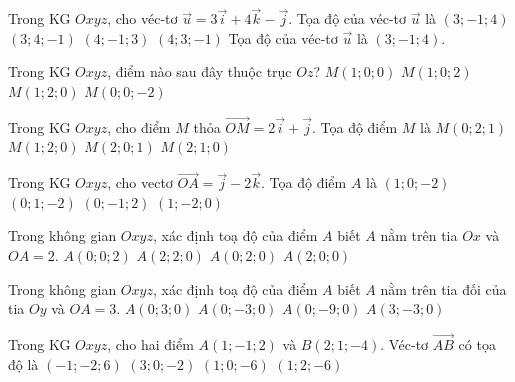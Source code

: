 \begin{ex}
	Trong KG $Oxyz$, cho véc-tơ $\overrightarrow{u}=3\overrightarrow{i}+4\overrightarrow{k}-\overrightarrow{j}$. Tọa độ của véc-tơ $\overrightarrow{u}$ là
	\choice
	{\True $(3;-1;4)$}
	{$(3;4;-1)$}
	{$(4;-1;3)$}
	{$(4;3;-1)$}
	\loigiai
	{
		Tọa độ của véc-tơ $\overrightarrow{u}$ là $(3;-1;4)$.
	}
\end{ex} 

\begin{ex}
	Trong KG $Oxyz$, điểm nào sau đây thuộc trục $Oz$?
	\choice
	{$M(1;0;0)$}
	{$M(1;0;2)$}
	{$M(1;2;0)$}
	{\True $M(0;0;-2)$}
\end{ex} 

\begin{ex}%
	Trong KG $Oxyz$, cho điểm $M$ thỏa $\vec{OM} = 2\vec{i} + \vec{j}$. Tọa độ điểm $M$ là
	\choice
	{$M(0;2;1)$}
	{$M(1;2;0)$}
	{$M(2;0;1)$}
	{\True$M(2;1;0)$}
\end{ex} 

\begin{ex}%
	Trong KG $Oxyz$, cho vectơ $\overrightarrow{OA}=\overrightarrow{j}-2\overrightarrow{k}$. Tọa độ điểm $A$ là
	\choice
	{$(1;0;-2)$}
	{\True $(0;1;-2)$}
	{$(0;-1;2)$}
	{$(1;-2;0)$}
\end{ex} 

\begin{ex}
	Trong không gian $O x y z$, xác định toạ độ của điểm $A$ biết $A$ nằm trên tia $O x$ và $O A=2$.
	\choice
	{$A(0;0;2)$}
	{$A(2;2;0)$}
	{$A(0;2;0)$}
	{\True $A(2;0;0)$}
\end{ex} 

\begin{ex}
	Trong không gian $O x y z$, xác định toạ độ của điểm $A$ biết $A$ nằm trên tia đối của tia $O y$ và $O A=3$.
	\choice
	{$A(0;3;0)$}
	{\True $A(0;-3;0)$}
	{$A(0;-9;0)$}
	{$A(3;-3;0)$}
\end{ex} 

\begin{ex}
	Trong KG $Oxyz$, cho hai điểm $A(1;-1;2)$ và $B(2;1;-4)$. Véc-tơ $\vec{AB}$ có tọa độ là
	\choice
	{$(-1;-2;6)$}
	{$(3;0;-2)$}
	{$(1;0;-6)$}
	{\True $(1;2;-6)$}
\end{ex} 

